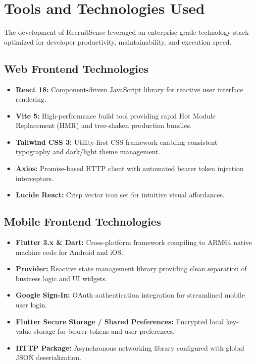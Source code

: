 \section{Tools and Technologies Used}
The development of RecruitSense leveraged an enterprise-grade technology stack optimized for developer productivity, maintainability, and execution speed.

\subsection{Web Frontend Technologies}
\begin{itemize}
    \item \textbf{React 18:} Component-driven JavaScript library for reactive user interface rendering.
    \item \textbf{Vite 5:} High-performance build tool providing rapid Hot Module Replacement (HMR) and tree-shaken production bundles.
    \item \textbf{Tailwind CSS 3:} Utility-first CSS framework enabling consistent typography and dark/light theme management.
    \item \textbf{Axios:} Promise-based HTTP client with automated bearer token injection interceptors.
    \item \textbf{Lucide React:} Crisp vector icon set for intuitive visual affordances.
\end{itemize}

\subsection{Mobile Frontend Technologies}
\begin{itemize}
    \item \textbf{Flutter 3.x \& Dart:} Cross-platform framework compiling to ARM64 native machine code for Android and iOS.
    \item \textbf{Provider:} Reactive state management library providing clean separation of business logic and UI widgets.
    \item \textbf{Google Sign-In:} OAuth authentication integration for streamlined mobile user login.
    \item \textbf{Flutter Secure Storage / Shared Preferences:} Encrypted local key-value storage for bearer tokens and user preferences.
    \item \textbf{HTTP Package:} Asynchronous networking library configured with global JSON deserialization.
\end{itemize}

